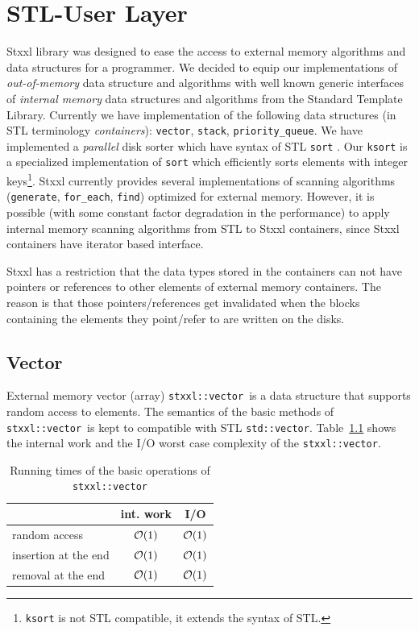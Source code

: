 \documentclass[twoside]{book}
\newcommand{\stxxl}{{\sc Stxxl} }
\begin{document}
\chapter{STL-User Layer}
\stxxl library was designed to ease the access to external memory
algorithms and data structures for a programmer. We decided to
equip our implementations of \emph{out-of-memory} data structure and
algorithms with well known generic interfaces of \emph{internal memory}
data structures and algorithms from the Standard Template Library.
Currently we have implementation of the following data structures (in
STL terminology \emph{containers}):
\texttt{vector}, \texttt{stack}, \texttt{priority\_queue}. We
have implemented a \emph{parallel} disk sorter which have syntax of
STL \texttt{sort} \cite{DemSan03}. Our \texttt{ksort} is a specialized
implementation 
of \texttt{sort} which efficiently sorts elements with integer
keys\footnote{\texttt{ksort} is not STL compatible, it extends the
syntax of STL.}. \stxxl currently provides several implementations of
scanning algorithms (\texttt{generate}, \texttt{for\_each},
\texttt{find}) optimized for external memory. However, it is possible
(with some constant factor degradation in the performance) to apply
internal memory scanning algorithms from STL to \stxxl 
containers, since \stxxl containers have iterator based interface.

\stxxl has a restriction that the data types stored in the containers
can not have pointers or references to other elements of external memory
containers. The reason is that those pointers/references get
invalidated when the blocks containing the elements they point/refer to are
written on the disks.


\newcommand{\xvector}{\texttt{stxxl::vector}}

\section{Vector}
External memory vector (array)
\xvector\ is a data structure 
that supports random access to elements. The semantics of the basic
methods of \xvector\ is kept to compatible with STL
\texttt{std::vector}. Table~\ref{rtvector} shows the internal work and
the I/O worst case complexity of the \xvector.

\begin{table}
\begin{center}
\caption{Running times of the basic operations of \xvector}
\label{rtvector}
\begin{tabular}{|l|c|c|}
\hline
                    & int. work & I/O \\
\hline\hline
random access       & $\mathcal{O}\!\left( 1\right)$ & $\mathcal{O}\!\left( 1\right)$\\
\hline
insertion at the end& $\mathcal{O}\!\left( 1\right)$ & $\mathcal{O}\!\left( 1\right)$\\
\hline
removal at the end  & $\mathcal{O}\!\left( 1\right)$ & $\mathcal{O}\!\left( 1\right)$ \\
\hline
\end{tabular}
\end{center}
\end{table}
\end{document}
